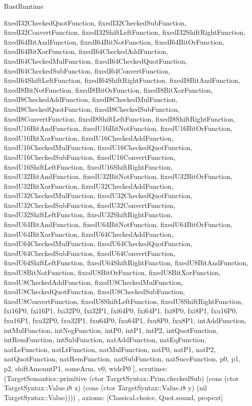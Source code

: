 \begin{lexlean}{RustRuntime}
\begin{semanticmodule}
{{      fixedI32CheckedQuotFunction,
      fixedI32CheckedSubFunction,
      fixedI32ConvertFunction,
      fixedI32ShiftLeftFunction,
      fixedI32ShiftRightFunction,
      fixedI64BitAndFunction,
      fixedI64BitNotFunction,
      fixedI64BitOrFunction,
      fixedI64BitXorFunction,
      fixedI64CheckedAddFunction,
      fixedI64CheckedMulFunction,
      fixedI64CheckedQuotFunction,
      fixedI64CheckedSubFunction,
      fixedI64ConvertFunction,
      fixedI64ShiftLeftFunction,
      fixedI64ShiftRightFunction,
      fixedI8BitAndFunction,
      fixedI8BitNotFunction,
      fixedI8BitOrFunction,
      fixedI8BitXorFunction,
      fixedI8CheckedAddFunction,
      fixedI8CheckedMulFunction,
      fixedI8CheckedQuotFunction,
      fixedI8CheckedSubFunction,
      fixedI8ConvertFunction,
      fixedI8ShiftLeftFunction,
      fixedI8ShiftRightFunction,
      fixedU16BitAndFunction,
      fixedU16BitNotFunction,
      fixedU16BitOrFunction,
      fixedU16BitXorFunction,
      fixedU16CheckedAddFunction,
      fixedU16CheckedMulFunction,
      fixedU16CheckedQuotFunction,
      fixedU16CheckedSubFunction,
      fixedU16ConvertFunction,
      fixedU16ShiftLeftFunction,
      fixedU16ShiftRightFunction,
      fixedU32BitAndFunction,
      fixedU32BitNotFunction,
      fixedU32BitOrFunction,
      fixedU32BitXorFunction,
      fixedU32CheckedAddFunction,
      fixedU32CheckedMulFunction,
      fixedU32CheckedQuotFunction,
      fixedU32CheckedSubFunction,
      fixedU32ConvertFunction,
      fixedU32ShiftLeftFunction,
      fixedU32ShiftRightFunction,
      fixedU64BitAndFunction,
      fixedU64BitNotFunction,
      fixedU64BitOrFunction,
      fixedU64BitXorFunction,
      fixedU64CheckedAddFunction,
      fixedU64CheckedMulFunction,
      fixedU64CheckedQuotFunction,
      fixedU64CheckedSubFunction,
      fixedU64ConvertFunction,
      fixedU64ShiftLeftFunction,
      fixedU64ShiftRightFunction,
      fixedU8BitAndFunction,
      fixedU8BitNotFunction,
      fixedU8BitOrFunction,
      fixedU8BitXorFunction,
      fixedU8CheckedAddFunction,
      fixedU8CheckedMulFunction,
      fixedU8CheckedQuotFunction,
      fixedU8CheckedSubFunction,
      fixedU8ConvertFunction,
      fixedU8ShiftLeftFunction,
      fixedU8ShiftRightFunction,
      fxi16P0,
      fxi16P1,
      fxi32P0,
      fxi32P1,
      fxi64P0,
      fxi64P1,
      fxi8P0,
      fxi8P1,
      fxu16P0,
      fxu16P1,
      fxu32P0,
      fxu32P1,
      fxu64P0,
      fxu64P1,
      fxu8P0,
      fxu8P1,
      intAddFunction,
      intMulFunction,
      intNegFunction,
      intP0,
      intP1,
      intP2,
      intQuotFunction,
      intRemFunction,
      intSubFunction,
      natAddFunction,
      natEqFunction,
      natLeFunction,
      natLtFunction,
      natMulFunction,
      natP0,
      natP1,
      natP2,
      natQuotFunction,
      natRemFunction,
      natSubFunction,
      natSuccFunction,
      p0,
      p1,
      p2,
      shiftAmountP1,
      someArm,
      v0,
      wideP0
    ],
    scrutinee: (TargetSemantics::primitive (ctor TargetSyntax::Prim.checkedSub) (cons (ctor TargetSyntax::Value.i8 x) (cons (ctor TargetSyntax::Value.i8 y) (nil TargetSyntax::Value))))
  },
  axioms: [Classical.choice, Quot.sound, propext]
}


\end{semanticmodule}
\end{lexlean}

